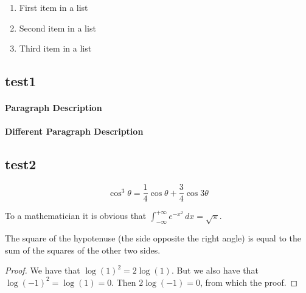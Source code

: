 \lipsum[5] %

\begin{enumerate}[noitemsep] %
\item First item in a list
\item Second item in a list
\item Third item in a list
\end{enumerate}


\subsection{test1}

\lipsum[6] %

\paragraph{Paragraph Description} \lipsum[7] %

\paragraph{Different Paragraph Description} \lipsum[8] %


\subsection{test2}

\lipsum[4] %

\begin{equation}
\cos^3 \theta =\frac{1}{4}\cos\theta+\frac{3}{4}\cos 3\theta
\label{eq:refname2}
\end{equation}

\lipsum[5] %

\begin{definition}[Gauss] 
To a mathematician it is obvious that
$\int_{-\infty}^{+\infty}
e^{-x^2}\,dx=\sqrt{\pi}$. 
\end{definition} 

\begin{theorem}[Pythagoras]
The square of the hypotenuse (the side opposite the right angle) is equal to the sum of the squares of the other two sides.
\end{theorem}

\begin{proof} 
We have that $\log(1)^2 = 2\log(1)$.
But we also have that $\log(-1)^2=\log(1)=0$.
Then $2\log(-1)=0$, from which the proof.
\end{proof}
